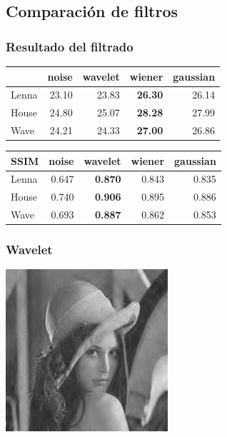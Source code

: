 \documentclass{beamer}
\begin{document}
  \subsection{Comparación de filtros}

  \begin{frame}
    \frametitle{Resultado del filtrado}
    \centering
    \begin{tabular}{lrrrr}
      \toprule
      {} &  noise &  wavelet &  wiener &  gaussian \\
      \midrule
      Lenna &  23.10 &    23.83 &   \bf{26.30} &     26.14 \\
      House &  24.80 &    25.07 &   \bf{28.28} &     27.99 \\
      Wave &  24.21 &    24.33 &   \bf{27.00} &     26.86 \\
      \bottomrule
      \end{tabular}
    
  
    \begin{tabular}{lrrrr}
      { SSIM } &  noise &  wavelet &  wiener &  gaussian \\
      \midrule
      Lenna &  0.647 &  \bf{0.870} &  0.843 &  0.835 \\
      House &  0.740 &  \bf{0.906} &  0.895 &  0.886 \\
      Wave &  0.693 &  \bf{0.887} &  0.862 &  0.853 \\
      \bottomrule
      \end{tabular}
  \end{frame}

  \begin{frame}
    \frametitle{Wavelet}
    \centering
    \includegraphics[width=6cm]{imgs/Comparacion/wavelet_Lenna.jpg}
  
  \end{frame}
\end{document}

